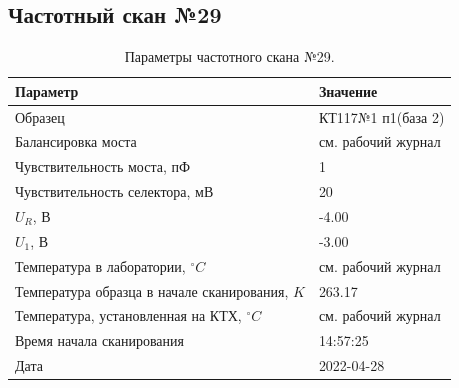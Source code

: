 \subsection{Частотный скан №29}
\begin{table}[!ht]
    \centering
    \caption{Параметры частотного скана №29.}
    \begin{tabular}{|l|l|}
        \hline
        Параметр                                       & Значение                  \\ \hline
        Образец                                        & КТ117№1 п1(база 2)        \\ \hline
        Балансировка моста                             & см. рабочий журнал        \\ \hline
        Чувствительность моста, пФ                     & 1                         \\ \hline
        Чувствительность селектора, мВ                 & 20                        \\ \hline
        $U_R$, В                                       & -4.00                     \\ \hline
        $U_1$, В                                       & -3.00                     \\ \hline
        Температура в лаборатории, $^\circ C$          & см. рабочий журнал        \\ \hline
        Температура образца в начале сканирования, $K$ & 263.17                    \\ \hline
        Температура, установленная на КТХ, $^\circ C$  & см. рабочий журнал        \\ \hline
        Время начала сканирования                      & 14:57:25                  \\ \hline
        Дата                                           & 2022-04-28                \\ \hline
    \end{tabular}
    \label{table:frequency_scan_29}
\end{table}


